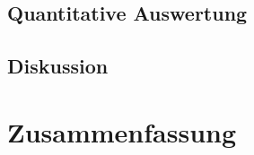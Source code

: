 \subsection{Quantitative Auswertung}
\label{sec:Evaluation:Auswertung:QuantitativeAuswertung}

\subsection{Diskussion}
\label{sec:Evaluation:Auswertung:Diskussion}

\section{Zusammenfassung}
\label{sec:Evaluation:Zusammenfassung}






